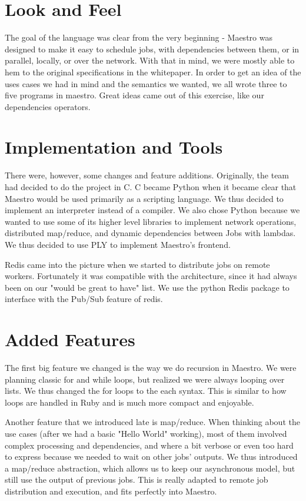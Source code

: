 \section{Look and Feel}
The goal of the language was clear from the very beginning - Maestro was designed to make it easy to schedule jobs, with dependencies between them, or in parallel, locally, or over the network.
With that in mind, we were mostly able to hem to the original specifications in the whitepaper.
In order to get an idea of the uses cases we had in mind and the semantics we wanted, we all wrote three to five programs in maestro.
Great ideas came out of this exercise, like our dependencies operators.

\section{Implementation and  Tools}
There were, however, some changes and feature additions. Originally, the team had decided to do the project in C. C became Python when it became clear that Maestro would be used primarily as a scripting language. We thus decided to implement an interpreter instead of a compiler.
We also chose Python because we wanted to use some of its higher level libraries to implement network operations, distributed map/reduce, and dynamic dependencies between Jobs with lambdas.
We thus decided to use PLY to implement Maestro's frontend.

Redis came into the picture when we started to distribute jobs on remote workers.
Fortunately it was compatible with the architecture, since it had always been on our "would be great to have" list.
We use the python Redis package to interface with the Pub/Sub feature of redis.

\section{Added Features}
The first big feature we changed is the way we do recursion in Maestro. We were planning classic for and while loops, but realized we were always looping over lists.
We thus changed the for loops to the each syntax. This is similar to how loops are handled in Ruby and is much more compact and enjoyable.

Another feature that we introduced late is map/reduce. When thinking about the use cases (after we had a basic "Hello World" working), most of them involved complex processing and dependencies, and where a bit verbose or even too hard to express because we needed to wait on other jobs' outputs.
We thus introduced a map/reduce abstraction, which allows us to keep our asynchronous model, but still use the output of previous jobs.
This is really adapted to remote job distribution and execution, and fits perfectly into Maestro.

